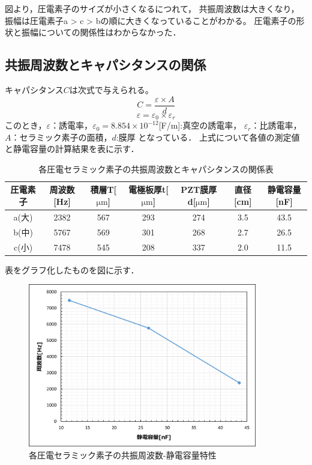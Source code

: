 \documentclass{ltjsarticle}
\begin{document}
		図より，圧電素子のサイズが小さくなるにつれて，
		共振周波数は大きくなり，振幅は圧電素子a > c > bの順に大きくなっていることがわかる。
		圧電素子の形状と振幅についての関係性はわからなかった．

	\subsection{共振周波数とキャパシタンスの関係}
		キャパシタンス$C$は次式で与えられる。
		\begin{equation}
			C = \frac{ε \times A}{d}
		\end{equation}
		\begin{equation}
			ε = ε_0 \times ε_r
		\end{equation}
		このとき，$ε$：誘電率，$ε_0 = 8.854 \times 10^{-12} $[F/m]:真空の誘電率， $ε_r$：比誘電率，
		$A$：セラミック素子の面積，$d$:膜厚 となっている．
		上式について各値の測定値と静電容量の計算結果を表に示す．
		\begin{table}[H]
		\begin{center}
		\caption{各圧電セラミック素子の共振周波数とキャパシタンスの関係表}
		\label{tab:各セラキャパシタンス}
		\begin{tabular}{c|cccccc} \toprule
		圧電素子& 周波数[Hz]& 積層T[$\mathrm{\mu m}$]& 電極板厚t[$\mathrm{\mu m}$]& PZT膜厚d[$\mathrm{\mu m}$]&直径[cm]& 静電容量[nF] \\ \hline
		a(大) & 2382 & 567 & 293 & 274 & 3.5 & 43.5\\
		b(中) & 5767 & 569 & 301 & 268 & 2.7 & 26.5\\
		c(小) & 7478 & 545 & 208 & 337 & 2.0 & 11.5\\ \bottomrule
		\end{tabular}
		\end{center}
		\end{table}

		表をグラフ化したものを図に示す．

			\begin{figure}[H]
			\centering
			\includegraphics[width = 10cm]{figs/week4-2.png}
			\caption{各圧電セラミック素子の共振周波数-静電容量特性}
			\label{fig:各セラキャパシタンス}
			\end{figure}
\end{document}
